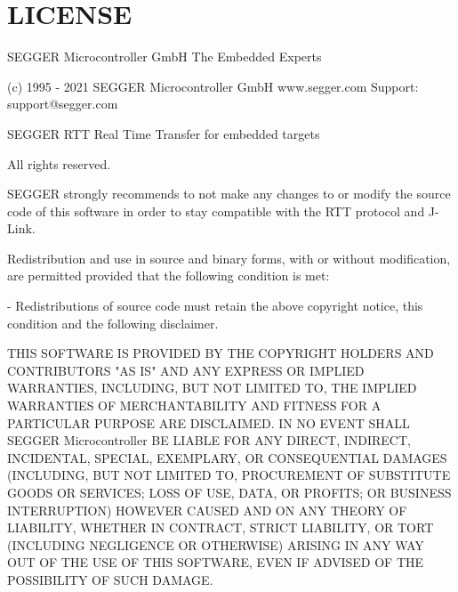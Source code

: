 \chapter{LICENSE}
\hypertarget{md_printers_2rtt_2segger__rtt_2_l_i_c_e_n_s_e}{}\label{md_printers_2rtt_2segger__rtt_2_l_i_c_e_n_s_e}
\begin{DoxyVerb}                SEGGER Microcontroller GmbH
                   The Embedded Experts

       (c) 1995 - 2021 SEGGER Microcontroller GmbH
      www.segger.com     Support: support@segger.com

    SEGGER RTT  Real Time Transfer for embedded targets


All rights reserved.

SEGGER strongly recommends to not make any changes
to or modify the source code of this software in order to stay
compatible with the RTT protocol and J-Link.

Redistribution and use in source and binary forms, with or
without modification, are permitted provided that the following
condition is met:

- Redistributions of source code must retain the above copyright
 notice, this condition and the following disclaimer.

THIS SOFTWARE IS PROVIDED BY THE COPYRIGHT HOLDERS AND
CONTRIBUTORS "AS IS" AND ANY EXPRESS OR IMPLIED WARRANTIES,
INCLUDING, BUT NOT LIMITED TO, THE IMPLIED WARRANTIES OF
MERCHANTABILITY AND FITNESS FOR A PARTICULAR PURPOSE ARE
DISCLAIMED. IN NO EVENT SHALL SEGGER Microcontroller BE LIABLE FOR
ANY DIRECT, INDIRECT, INCIDENTAL, SPECIAL, EXEMPLARY, OR
CONSEQUENTIAL DAMAGES (INCLUDING, BUT NOT LIMITED TO, PROCUREMENT
OF SUBSTITUTE GOODS OR SERVICES; LOSS OF USE, DATA, OR PROFITS;
OR BUSINESS INTERRUPTION) HOWEVER CAUSED AND ON ANY THEORY OF
LIABILITY, WHETHER IN CONTRACT, STRICT LIABILITY, OR TORT
(INCLUDING NEGLIGENCE OR OTHERWISE) ARISING IN ANY WAY OUT OF THE
USE OF THIS SOFTWARE, EVEN IF ADVISED OF THE POSSIBILITY OF SUCH
DAMAGE.
\end{DoxyVerb}
 